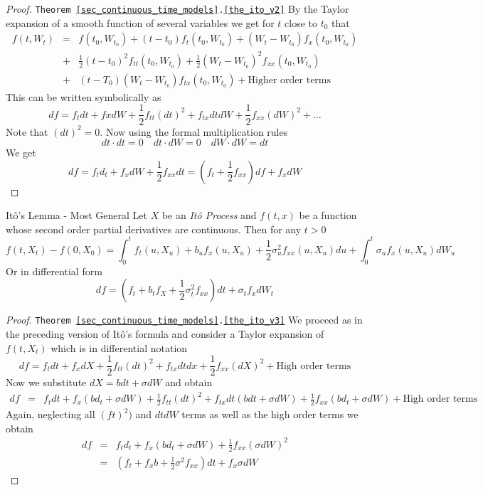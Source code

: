 \documentclass[11pt,a4paper]{article}
\begin{document}
  \begin{proof}{\texttt{Theorem \ref{sec_continuous_time_models}.\ref{the_ito_v2}}}
    By the Taylor expansion of a smooth function of several variables we get for $t$ close to $t_0$ that
    \[\begin{array}{rcl}
      f(t,W_t)&=&f(t_0,W_{t_0})+(t-t_0)f_t(t_0,W_{t_0})+(W_t-W_{t_0})f_x(t_0,W_{t_0})\\
      &+&\frac12(t-t_0)^2f_{tt}(t_0,W_{t_0})+\frac12(W_t-W_{t_0})^2f_{xx}(t_0,W_{t_0})\\
      &+&(t-T_0)(W_t-W_{t_0})f_{tx}(t_0,W_{t_0})+\text{Higher order terms}
    \end{array}\]
    This can be written symbolically as
    \[ df=f_tdt+fxdW+\frac12f_{tt}(dt)^2+f_{tx}dtdW+\frac12f_{xx}(dW)^2+\dots \]
    Note that $(dt)^2=0$. Now using the formal multiplication rules
    \[ dt\cdot dt=0\quad dt\cdot dW=0\quad dW\cdot dW=dt \]
    We get
    \[ df=f_td_t+f_xdW+\frac12f_{xx}dt=(f_t+\frac12f_{xx})df+f_xdW \]
    \proved
  \end{proof}

  \begin{theorem}{It\^o's Lemma - Most General}\label{the_ito_v3}
    Let $X$ be an \textit{It\^o Process} and $f(t,x)$ be a function  whose second order partial derivatives are continuous. Then for any $t>0$
    \[ f(t,X_t)-f(0,X_0)=\int_0^tf_t(u,X_u)+b_uf_x(u,X_u)+\frac12\sigma^2_uf_{xx}(u,X_u)du+\int_0^t\sigma_uf_x(u,X_u)dW_u \]
    Or in differential form
    \[ df=\left(f_t+b_tf_X+\frac12\sigma_t^2f_{xx}\right)dt+\sigma_tf_xdW_t \]
  \end{theorem}

  \begin{proof}{\texttt{Theorem \ref{sec_continuous_time_models}.\ref{the_ito_v3}}}
    We proceed as in the preceding version of It\^o's formula and consider a Taylor expansion of $f(t,X_t)$ which is in differential notation
    \[ df=f_tdt+f_xdX+\frac12f_{tt}(dt)^2+f_{tx}dtdx+\frac12f_{xx}(dX)^2+\text{High order terms} \]
    Now we substitute $dX=bdt+\sigma dW$ and obtain
    \[\begin{array}{rcl}
      df&=&f_tdt+f_x(bd_t+\sigma dW)+\frac12f_{tt}(dt)^2+f_{tx}dt(bdt+\sigma dW)+\frac12f_{xx}(bd_t+\sigma dW)+\text{High order terms}
    \end{array}\]
    Again, neglecting all $(ft)^2)$ and $dtdW$ terms as well as the high order terms we obtain
    \[\begin{array}{rcl}
      df&=&f_td_t+f_x(bd_t+\sigma dW)+\frac12f_{xx}(\sigma dW)^2\\
      &=&(f_t+f_xb+\frac12\sigma^2f_{xx})dt+f_x\sigma dW
    \end{array}\]
    \proved
  \end{proof}
\end{document}
